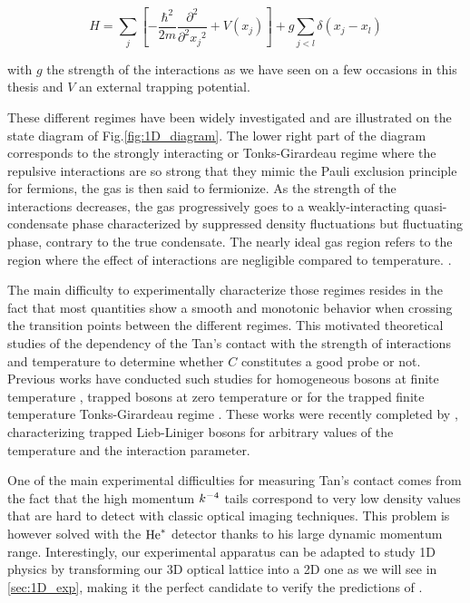 \begin{equation}
    H = \sum_j \left[ - \frac{ \hbar^2}{2m} \frac{\partial^2}{\partial^2 {x_j}^2} + V(x_j) \right] + g \sum_{j<l} \delta(x_j - x_l) 
\end{equation}

\noindent with $g$ the strength of the interactions as we have seen on a few occasions in this thesis and $V$ an external trapping potential. 


These different regimes have been widely investigated \cite{petrov2000regimes} and are illustrated on the state diagram of Fig.\ref{fig:1D_diagram}. The lower right part of the diagram corresponds to the strongly interacting or Tonks-Girardeau regime where the repulsive interactions are so strong that they mimic the Pauli exclusion principle for fermions, the gas is then said to fermionize. As the strength of the interactions decreases, the gas progressively goes to a weakly-interacting quasi-condensate phase characterized by suppressed density fluctuations but fluctuating phase, contrary to the true condensate. The nearly ideal gas region refers to the region where the effect of interactions are negligible compared to temperature. .

The main difficulty to experimentally characterize those regimes resides in the fact that most quantities show a smooth and monotonic behavior when crossing the transition points between the different regimes. This motivated theoretical studies of the dependency of the Tan's contact with the strength of interactions and temperature to determine whether $C$ constitutes a good probe or not. Previous works have conducted such studies for homogeneous bosons at finite temperature \cite{kheruntsyan2003pair,kormos2009expectation}, trapped bosons at zero temperature \cite{minguzzi2002high,olshanii2003short} or for the trapped finite temperature Tonks-Girardeau regime \cite{vignolo2013universal}. These works were recently completed by \cite{yao2018tan}, characterizing trapped Lieb-Liniger bosons for arbitrary values of the temperature and the interaction parameter.

One of the main experimental difficulties for measuring Tan's contact comes from the fact that the high momentum $k^{-4}$ tails correspond to very low density values that are hard to detect with classic optical imaging techniques. This problem is however solved with the $\mathrm{He}^*$ detector thanks to his large dynamic momentum range. Interestingly, our experimental apparatus can be adapted to study 1D physics by transforming our 3D optical lattice into a 2D one as we will see in \ref{sec:1D_exp}, making it the perfect candidate to verify the predictions of \cite{yao2018tan}.

